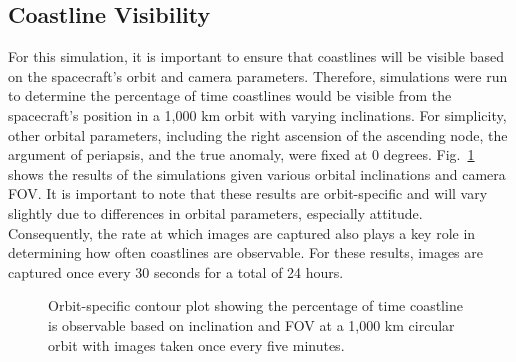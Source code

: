 \documentclass[]{aiaa-tc}%
\begin{document}
\subsection{Coastline Visibility}
For this simulation, it is important to ensure that coastlines will be visible based on the spacecraft's orbit and camera parameters.  Therefore, simulations were run to determine the percentage of time coastlines would be visible from the spacecraft's position in a 1,000 km orbit with varying inclinations.  For simplicity, other orbital parameters, including the right ascension of the ascending node, the argument of periapsis, and the true anomaly, were fixed at 0 degrees.  Fig.~\ref{fig:contourplot} shows the results of the simulations given various orbital inclinations and camera FOV.  It is important to note that these results are orbit-specific and will vary slightly due to differences in orbital parameters, especially attitude. Consequently, the rate at which images are captured also plays a key role in determining how often coastlines are observable.  For these results, images are captured once every 30 seconds for a total of 24 hours.
\begin{figure}[h!]
\centering
{} %
\caption{Orbit-specific contour plot showing the percentage of time coastline is observable based on inclination and FOV at a 1,000 km circular orbit with images taken once every five minutes.}
\label{fig:contourplot}
\end{figure}

\end{document}

